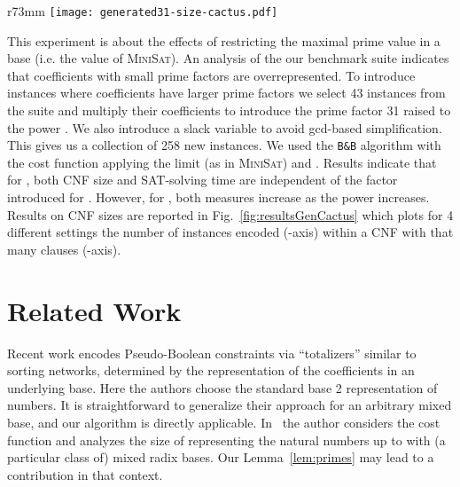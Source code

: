 \documentclass[envcountsame]{llncs}
\newcommand\minisatp{\textsc{MiniSat}}
\begin{document}
\begin{wrapfigure}{r}{73mm}\vspace{0mm}
  \texttt{[image: generated31-size-cactus.pdf]}
  \vspace{-4ex}
  \caption{\small
Experiment 4:  Number (-axis) of instances encoded within
    number of clauses (-axis) on 4 configurations. From top line
    to bottom: (yellow) , , (red) , ,
    (green) , , and (blue) , .}
\label{fig:resultsGenCactus}
\vspace{-4ex}
\end{wrapfigure}
This experiment is about the effects of restricting the maximal prime
value in a base (i.e. the value  of \minisatp).
An analysis of the our benchmark suite indicates that coefficients
with small prime factors are overrepresented.
To introduce instances where coefficients have larger prime factors we
select 43 instances from the suite and multiply their coefficients to
introduce the prime factor 31 raised to the power . We also introduce a slack
variable 
to avoid gcd-based simplification.
This gives us a collection of 258 new instances.
We used the \texttt{B\&B} algorithm
with the  cost function applying the limit  (as in
\minisatp) and .
Results indicate that for , both CNF size
and
SAT-solving time are independent of the factor  introduced for
. However, for , both measures increase as the power
 increases. Results on CNF sizes are reported in Fig.\
\ref{fig:resultsGenCactus} which plots for 4 different settings the
number of instances encoded (-axis) within a CNF with that many
clauses (-axis). 
















\section{Related Work}\label{relwork}

Recent work \cite{BailleuxBR09} encodes Pseudo-Boolean constraints via
``totalizers'' similar to sorting networks, determined by the
representation of the coefficients in an underlying base.  Here the
authors choose the standard base 2 representation of numbers. It is
straightforward to generalize their approach for an arbitrary mixed
base, and our algorithm is directly applicable.
In~\cite{Sidorov99} the author considers the  cost
function and analyzes the size of representing the natural numbers up
to  with (a particular class of) mixed radix bases.  
Our Lemma~\ref{lem:primes} may lead to a contribution in that context.
\end{document}
